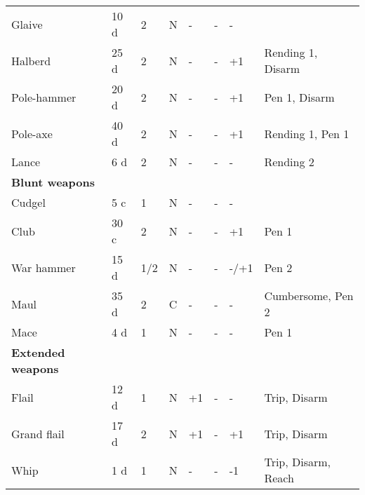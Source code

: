 \documentclass[a4paper,11pt,oneside]{book}
\newcommand{\textlf}[1]{\textbf{\titlecap{#1}}}
\begin{document}
\begin{table}[ht!]
\begin{tabular}{|l|l|l|l|l|l|l|l|}
		Glaive & 10 d & 2 & N & - & - & - & \textlf{damage edge+} \\
		Halberd & 25 d & 2 & N & - & - & +1 & Rending 1, Disarm\\
		Pole-hammer & 20 d & 2 & N & - & - & +1 & Pen 1, Disarm\\ 
		Pole-axe & 40 d & 2 & N & - & - & +1 & Rending 1, Pen 1 \\
		Lance & 6 d & 2 & N & - & - & - & Rending 2\\
		\hline
		\textbf{Blunt weapons} & & & & & & & \\
		\hline
		Cudgel & 5 c & 1  & N & - & - & - &  \\
		Club & 30 c & 2 & N & - & - & +1 & Pen 1 \\
		War hammer & 15 d & 1/2 & N & - & - & -/+1 & Pen 2 \\ 
		Maul & 35 d & 2 & C & - & - & - & Cumbersome, Pen 2 \\
		Mace & 4 d & 1 & N & - & - & - & Pen 1 \\
		\hline
		\textbf{Extended weapons} & & & & & & & \\
		\hline
		Flail & 12 d & 1 & N & +1 & - & - & Trip, Disarm \\ 
		Grand flail & 17 d & 2 & N & +1 & - & +1 & Trip, Disarm\\
		Whip & 1 d & 1 & N & - & - & -1 & Trip, Disarm, Reach\\
		\hline
	\end{tabular}
\end{table}
\end{document}
